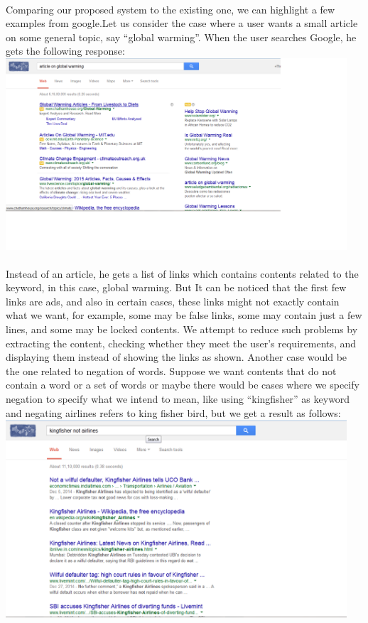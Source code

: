 \documentclass[a4paper]{report}
\begin{document}
\paragraph{}
\large\textnormal{Comparing our proposed system to the existing one, we can highlight a few examples from google.Let us consider the case where a user wants a small article on some general topic, say “global warming”. When the user searches Google, he gets the following response:}
\vspace{0.1cm}
\includegraphics[width = 5in]{1.png} 
\vspace{0.1cm}
\paragraph{}
\large\textnormal{Instead of an article, he gets a list of links which contains contents related to the keyword, in this case, global warming. But It can be noticed that the first few links are ads, and also in certain cases, these links might not exactly contain what we want, for example, some may be false links, some may contain just a few lines, and some may be locked contents. We attempt to reduce such problems by extracting the content, checking whether they meet the user’s requirements, and displaying them instead of 
showing the links as shown. Another case would be the one related to negation of words. Suppose we want contents that do not contain a word or a set of words or maybe there would be cases where we specify negation to specify what we intend to mean, like using “kingfisher” as keyword and negating airlines refers to king fisher bird, but we get a result as follows:}
\vspace{.1cm}
\includegraphics[width = 5in]{2.png} 
\vspace{.1cm}
\end{document}
